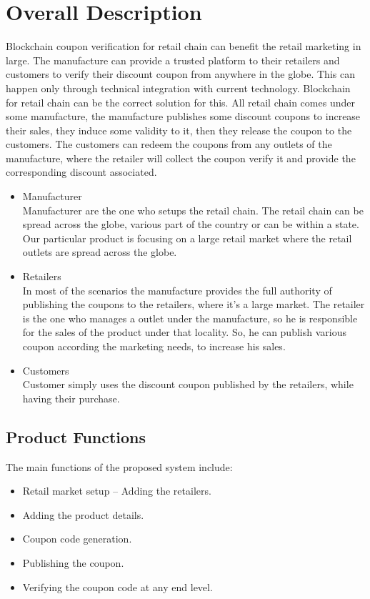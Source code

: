 \section{Overall Description}
\par
Blockchain coupon verification for retail chain can benefit the retail
marketing in large. The manufacture can provide a trusted platform to their
retailers and customers to verify their discount coupon from anywhere in the
globe. This can happen only through technical integration with current
technology. Blockchain for retail chain can be the correct solution for this. All
retail chain comes under some manufacture, the manufacture publishes some
discount coupons to increase their sales, they induce some validity to it, then they
release the coupon to the customers. The customers can redeem the coupons from
any outlets of the manufacture, where the retailer will collect the coupon verify it
and provide the corresponding discount associated.

\begin{itemize}
\item Manufacturer\\
 Manufacturer are the one who setups the retail chain. The retail chain can
be spread across the globe, various part of the country or can be within a state.
Our particular product is focusing on a large retail market where the retail outlets
are spread across the globe.
\item Retailers \\
 In most of the scenarios the manufacture provides the full authority of
publishing the coupons to the retailers, where it’s a large market.
The retailer is the one who manages a outlet under the manufacture, so he
is responsible for the sales of the product under that locality. So, he can publish
various coupon according the marketing needs, to increase his sales.
\item Customers\\
Customer simply uses the discount coupon published by the retailers, while
having their purchase.
\end{itemize}


\subsection{Product Functions}
The main functions of the proposed system include:
\begin{itemize}
    \item Retail market setup – Adding the retailers.
    \item Adding the product details.
    \item Coupon code generation.
    \item Publishing the coupon.
    \item Verifying the coupon code at any end level.
\end{itemize}



